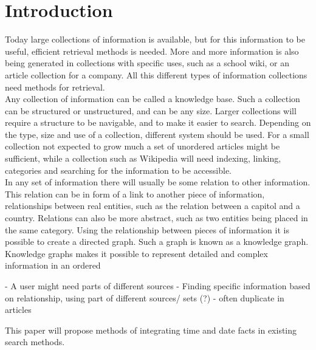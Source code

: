 
\chapter{Introduction}
Today large collections of information is available, but for this information to be useful, efficient retrieval methods is needed. More and more information is also being generated in collections with specific uses, such as a school wiki, or an article collection for a company. All this different types of information collections need methods for retrieval.\\

Any collection of information can be called a knowledge base. Such a collection can be structured or unstructured, and can be any size. Larger collections will require a structure to be navigable, and to make it easier to search. Depending on the type, size and use of a collection, different system should be used. For a small collection not expected to grow much a set of unordered articles might be sufficient, while a collection such as Wikipedia will need indexing, linking, categories and searching for the information to be accessible.\\

In any set of information there will usually be some relation to other information. This relation can be in form of a link to another piece of information, relationships between real entities, such as the relation between a capitol and a country. Relations can also be more abstract, such as two entities being placed in the same category. Using the relationship between pieces of information it is possible to create a directed graph. Such a graph is known as a knowledge graph.\\

Knowledge graphs makes it possible to represent detailed and complex information in an ordered 

- A user might need parts of different sources
- Finding specific information based on relationship, using part of different sources/ sets (?)
- often duplicate in articles 



This paper will propose methods of integrating time and date facts in existing search methods.\\

